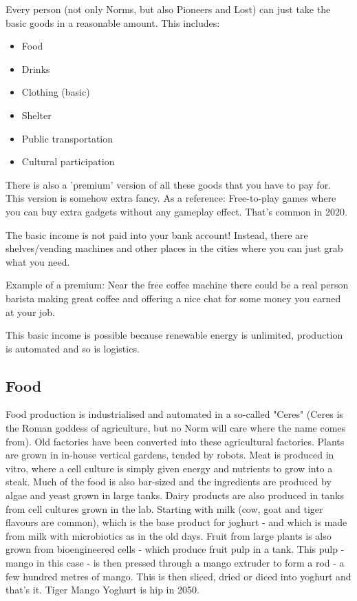 Every person (not only Norms, but also Pioneers and Lost) can just take the basic goods in a reasonable amount. This includes:

\begin{itemize}
    \item Food
    \item Drinks
    \item Clothing (basic)
    \item Shelter
    \item Public transportation
    \item Cultural participation
\end{itemize}

There is also a 'premium' version of all these goods that you have to pay for. This version is somehow extra fancy. As a reference: Free-to-play games where you can buy extra gadgets without any gameplay effect. That's common in 2020.

The basic income is not paid into your bank account! Instead, there are shelves/vending machines and other places in the cities where you can just grab what you need.

Example of a premium: Near the free coffee machine there could be a real person barista making great coffee and offering a nice chat for some money you earned at your job.

This basic income is possible because renewable energy is unlimited, production is automated and so is logistics.

\subsection{Food}
\label{sec: norm food}

Food production is industrialised and automated in a so-called "Ceres" (Ceres is the Roman goddess of agriculture, but no Norm will care where the name comes from). Old factories have been converted into these agricultural factories. Plants are grown in in-house vertical gardens, tended by robots.
Meat is produced in vitro, where a cell culture is simply given energy and nutrients to grow into a steak. Much of the food is also bar-sized and the ingredients are produced by algae and yeast grown in large tanks.
Dairy products are also produced in tanks from cell cultures grown in the lab. Starting with milk (cow, goat and tiger flavours are common), which is the base product for joghurt - and which is made from milk with microbiotics as in the old days.
Fruit from large plants is also grown from bioengineered cells - which produce fruit pulp in a tank. This pulp - mango in this case - is then pressed through a mango extruder to form a rod - a few hundred metres of mango. This is then sliced, dried or diced into yoghurt and that's it. Tiger Mango Yoghurt is hip in 2050.


